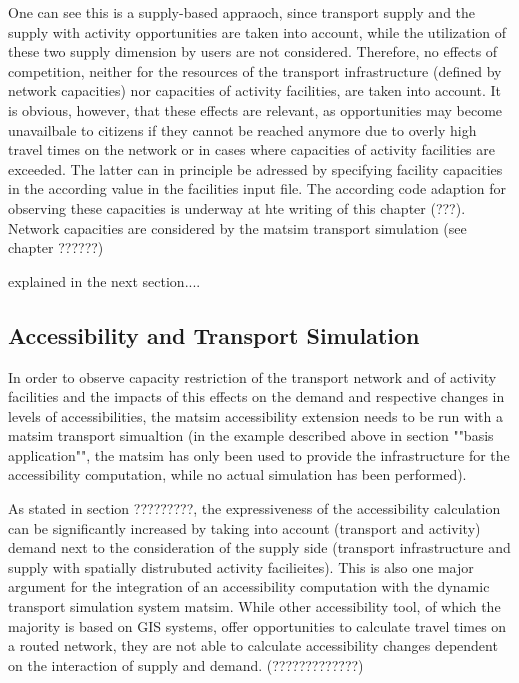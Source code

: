 One can see this is a supply-based appraoch, since transport supply and the supply with activity opportunities are taken into account, while the utilization of these two supply dimension by users are not considered. Therefore, no effects of competition, neither for the resources of the transport infrastructure (defined by network capacities) nor capacities of activity facilities, are taken into account. It is obvious, however, that these effects are relevant, as opportunities may become unavailbale to citizens if they cannot be reached anymore due to overly high travel times on the network or in cases where capacities of activity facilities are exceeded. The latter can in principle be adressed by specifying facility capacities in the according value in the facilities input file. The according code adaption for observing these capacities is underway at hte writing of this chapter (???). Network capacities are considered by the \gls{matsim} transport simulation (see chapter ??????)

explained in the next section....



\subsection{Accessibility and Transport Simulation}
In order to observe capacity restriction of the transport network and of activity facilities and the impacts of this effects on the demand and respective changes in levels of accessibilities, the \gls{matsim} accessibility extension needs to be run with a \gls{matsim} transport simualtion (in the example described above in section ""basis application"", the \gls{matsim} has only been used to provide the infrastructure for the accessibility computation, while no actual simulation has been performed).

As stated in section ?????????, the expressiveness of the accessibility calculation can be significantly increased by taking into account (transport and activity) demand next to the consideration of the supply side (transport infrastructure and supply with spatially distrubuted activity facilieites). This is also one major argument for the integration of an accessibility computation with the dynamic transport simulation system \gls{matsim}. While other accessibility tool, of which the majority is based on GIS systems, offer opportunities to calculate travel times on a routed network, they are not able to calculate accessibility changes dependent on the interaction of supply and demand. (?????????????)


